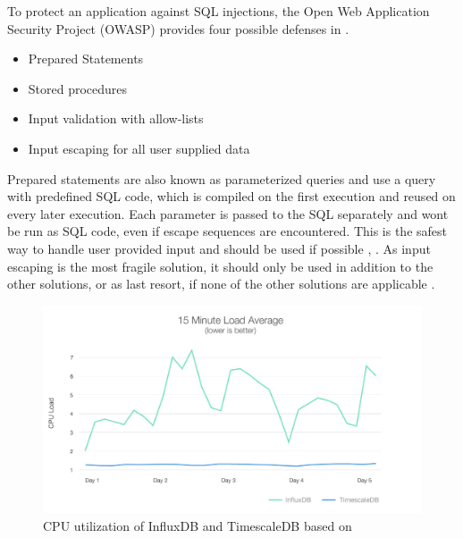         
        To protect an application against SQL injections, the Open Web Application Security Project (OWASP) provides four possible defenses in \cite{owasp_foundation_sql_2021}.
        \begin{itemize}
            \item Prepared Statements
            \item Stored procedures
            \item Input validation with allow-lists 
            \item Input escaping for all user supplied data
        \end{itemize}
        
        Prepared statements are also known as parameterized queries and use a query with predefined SQL code, which is compiled on the first execution and reused on every later execution. Each parameter is passed to the SQL separately and wont be run as SQL code, even if escape sequences are encountered.  This is the safest way to handle user provided input and should be used if possible \cite{owasp_foundation_sql_2021}, \cite{benita_preventing_2021}. As input escaping is the most fragile solution, it should only be used in addition to the other solutions, or as last resort, if none of the other solutions are applicable \cite{owasp_foundation_sql_2021}. 

        \begin{figure}
            \centering
            \includegraphics[width=\textwidth]{latex/figures/cpu_load_influx_ts.png}
            \caption[CPU utilization of InfluxDB and TimescaleDB]{CPU utilization of InfluxDB and TimescaleDB based on \cite{freedman_timescaledb_2020}}
            \label{fig:cpu_db}
        \end{figure}        

\newpage
%

